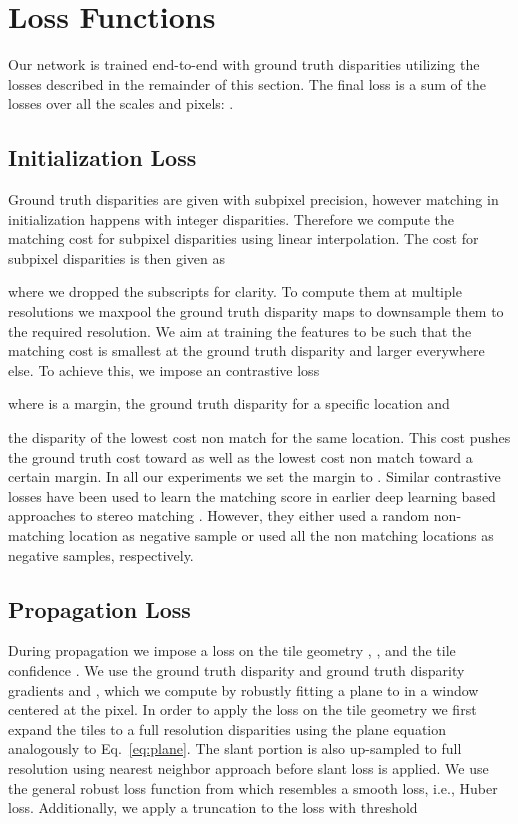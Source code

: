 \documentclass[final]{cvpr}
\begin{document}
\section{Loss Functions}
Our network is trained end-to-end with ground truth disparities  utilizing the losses described in the remainder of this section. The final loss is a sum of the losses over all the scales and pixels: .

\subsection{Initialization Loss}
Ground truth disparities are given with subpixel precision, however matching in initialization happens with integer disparities. Therefore we compute the matching cost for subpixel disparities using linear interpolation. The cost for subpixel disparities is then  given as

where we dropped the  subscripts for clarity. To compute them at multiple resolutions we maxpool the ground truth disparity maps to downsample them to the required resolution. 
We aim at training the features   to be such that the matching cost  is smallest at the ground truth disparity and larger everywhere else. To achieve this, we impose an  contrastive loss \cite{Hadsell2006}

where  is a margin,  the ground truth disparity for a specific location and 

the disparity of the lowest cost non match for the same location. This cost pushes the ground truth cost toward  as well as the lowest cost non match toward a certain margin. In all our experiments we set the margin to . Similar contrastive losses have been used to learn the matching score in earlier deep learning based approaches to stereo matching \cite{zbontar2016stereo,luo2016efficient}. However, they either used a random non-matching location as negative sample or used all the non matching locations as negative samples, respectively.

\subsection{Propagation Loss}
During propagation we impose a loss on the tile geometry , ,  and the tile confidence .  We use the ground truth disparity  and ground truth disparity gradients  and , which we compute by robustly fitting a plane to  in a  window centered at the pixel.
In order to apply the loss on the tile geometry we first expand the tiles to a full resolution disparities  using the plane equation  analogously to Eq.~\ref{eq:plane}. The slant portion is also up-sampled to full resolution using nearest neighbor approach before slant loss is applied.
We use the general robust loss function  from \cite{barron2019general} which resembles a smooth  loss, i.e., Huber loss. Additionally, we apply a truncation to the loss with threshold 
\end{document}
